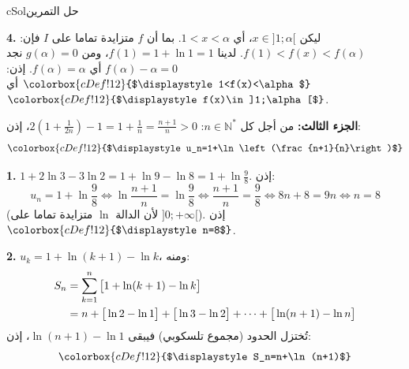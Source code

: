 \documentclass[12pt,a4paper]{article}
\newcounter{exo}
\newenvironment{hal}{\Needspace{12\baselineskip}\begin{otherlanguage}{english}\begin{arbox}[breakable]{cSol}{حل التمرين \theexo}}{\end{arbox}\end{otherlanguage}}
\renewcommand{\cdots}{\mathinner{\cdotp\cdotp\cdotp}}
\newcommand{\N}{\mathbb{N}}
\newcommand{\bx}[1]{\ensuremath{\colorbox{cDef!12}{$\displaystyle #1$}}}
\newcommand{\QQ}[1]{\par\smallskip\textbf{#1.} }
\begin{document}
\begin{hal}
\QQ{4} ليكن $x\in]1;\alpha[$، أي $1<x<\alpha$. بما أن $f$ متزايدة تماما على $I$ فإن: $f(1)<f(x)<f(\alpha)$.
لدينا $f(1)=1+\ln1=1$، ومن $g(\alpha)=0$ نجد $f(\alpha)-\alpha=0$ أي $f(\alpha)=\alpha$. إذن:
\bx{1<f(x)<\alpha} أي \bx{f(x)\in]1;\alpha[}.

\textbf{الجزء الثالث:} من أجل كل $n\in\N^{*}$: $2\left(1+\frac{1}{2n}\right)-1=1+\frac1n=\frac{n+1}{n}>0$، إذن:
\[\bx{u_n=1+\ln\left(\frac{n+1}{n}\right)}\]

\QQ{1} $1+2\ln3-3\ln2=1+\ln 9-\ln 8=1+\ln\frac98$. إذن:
\[u_n=1+\ln\frac98\iff \ln\frac{n+1}{n}=\ln\frac98\iff \frac{n+1}{n}=\frac98\iff 8n+8=9n\iff n=8\]
(لأن الدالة $\ln$ متزايدة تماما على $]0;+\infty[$). إذن \bx{n=8}.

\QQ{2} $u_k=1+\ln(k+1)-\ln k$، ومنه:
\begin{align*}
S_n&=\sum_{k=1}^{n}\big[1+\ln(k+1)-\ln k\big]\\
&=n+\big[\ln2-\ln1\big]+\big[\ln3-\ln2\big]+\cdots+\big[\ln(n+1)-\ln n\big]
\end{align*}
تُختزل الحدود (مجموع تلسكوبي) فيبقى $\ln(n+1)-\ln 1$، إذن:
\[\bx{S_n=n+\ln(n+1)}\]
\end{hal}
\end{document}
